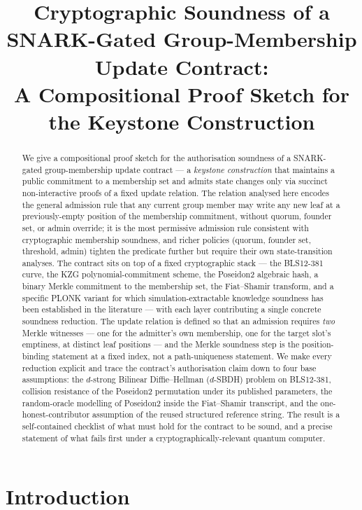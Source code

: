 \documentclass[11pt,a4paper]{article}
\title{Cryptographic Soundness of a SNARK-Gated Group-Membership Update Contract:\\
       A Compositional Proof Sketch for the Keystone Construction}
\author{}
\date{}
\theoremstyle{plain}
\theoremstyle{definition}
\begin{document}
\maketitle

\begin{abstract}
We give a compositional proof sketch for the authorisation
soundness of a SNARK-gated group-membership update contract --- a
\emph{keystone construction} that maintains a public commitment
to a membership set and admits state changes only via succinct
non-interactive proofs of a fixed update relation. The relation
analysed here encodes the general admission rule that any
current group member may write any new leaf at a
previously-empty position of the membership commitment, without
quorum, founder set, or admin override; it is the most permissive
admission rule consistent with cryptographic membership soundness,
and richer policies (quorum, founder set, threshold, admin)
tighten the predicate further but require their own
state-transition analyses. The contract sits on top of a fixed
cryptographic stack --- the BLS12-381 curve, the KZG
polynomial-commitment scheme, the Poseidon2 algebraic hash, a
binary Merkle commitment to the membership set, the Fiat--Shamir
transform, and a specific PLONK variant for which
simulation-extractable knowledge soundness has been established
in the literature --- with each layer contributing a single
concrete soundness reduction. The update relation is defined so
that an admission requires \emph{two} Merkle witnesses --- one
for the admitter's own membership, one for the target slot's
emptiness, at distinct leaf positions --- and the Merkle soundness
step is the position-binding statement at a fixed index, not a
path-uniqueness statement. We make every reduction explicit and
trace the contract's authorisation claim down to four base
assumptions: the $d$-strong Bilinear Diffie--Hellman ($d$-SBDH)
problem on BLS12-381, collision resistance of the Poseidon2
permutation under its published parameters, the random-oracle
modelling of Poseidon2 inside the Fiat--Shamir transcript, and
the one-honest-contributor assumption of the reused structured
reference string. The result is a self-contained checklist of
what must hold for the contract to be sound, and a precise
statement of what fails first under a cryptographically-relevant
quantum computer.
\end{abstract}

\section{Introduction}
\label{sec:intro}
\end{document}
